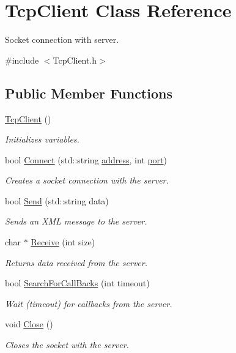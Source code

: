 \hypertarget{classTcpClient}{\section{Tcp\-Client Class Reference}
\label{classTcpClient}
}


Socket connection with server.  




{\ttfamily \#include $<$Tcp\-Client.\-h$>$}

\subsection*{Public Member Functions}
\begin{DoxyCompactItemize}
\item 
\hyperlink{classTcpClient_ad2e6b99a63964caa825c44e93ff8e777}{Tcp\-Client} ()
\begin{DoxyCompactList}\small\item\em Initializes variables. \end{DoxyCompactList}\item 
bool \hyperlink{classTcpClient_ac2e9bb63b4e0dc8f4508aa2a85431fe2}{Connect} (std\-::string \hyperlink{classTcpClient_a8bcb24ebf1d8e22e9185f3056fd108c4}{address}, int \hyperlink{classTcpClient_aa112ef0470437e790931b3ec9c98a800}{port})
\begin{DoxyCompactList}\small\item\em Creates a socket connection with the server. \end{DoxyCompactList}\item 
bool \hyperlink{classTcpClient_acac6ca70c9d99e09731181e5239381ae}{Send} (std\-::string data)
\begin{DoxyCompactList}\small\item\em Sends an X\-M\-L message to the server. \end{DoxyCompactList}\item 
char $\ast$ \hyperlink{classTcpClient_a83e87c3df7d1a5a27c075f9582c6350e}{Receive} (int size)
\begin{DoxyCompactList}\small\item\em Returns data received from the server. \end{DoxyCompactList}\item 
bool \hyperlink{classTcpClient_a4df900657b1cb45aced143fe21a81937}{Search\-For\-Call\-Backs} (int timeout)
\begin{DoxyCompactList}\small\item\em Wait (timeout) for callbacks from the server. \end{DoxyCompactList}\item 
void \hyperlink{classTcpClient_ae7a96d69db612ef4827ee23c31332a4e}{Close} ()
\begin{DoxyCompactList}\small\item\em Closes the socket with the server. \end{DoxyCompactList}\end{DoxyCompactItemize}
